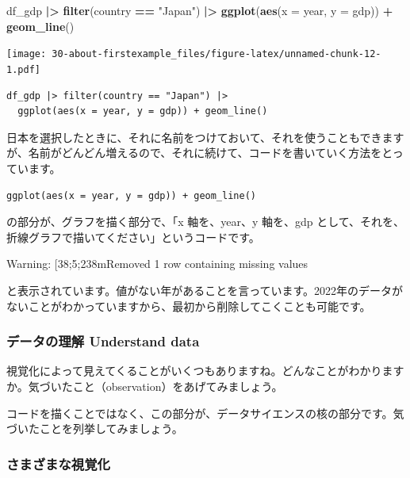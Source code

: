 \documentclass[
  xelatex, ja=standard]{bxjsbook}
\newenvironment{Shaded}{\begin{snugshade}}{\end{snugshade}}
\newcommand{\AttributeTok}[1]{\textcolor[rgb]{0.13,0.29,0.53}{#1}}
\newcommand{\FunctionTok}[1]{\textcolor[rgb]{0.13,0.29,0.53}{\textbf{#1}}}
\newcommand{\NormalTok}[1]{#1}
\newcommand{\SpecialCharTok}[1]{\textcolor[rgb]{0.81,0.36,0.00}{\textbf{#1}}}
\newcommand{\StringTok}[1]{\textcolor[rgb]{0.31,0.60,0.02}{#1}}
\theoremstyle{definition}
\theoremstyle{definition}
\theoremstyle{definition}
\theoremstyle{definition}
\theoremstyle{remark}
\begin{document}
\begin{Shaded}
\begin{Highlighting}[]
\NormalTok{df\_gdp }\SpecialCharTok{|\textgreater{}} \FunctionTok{filter}\NormalTok{(country }\SpecialCharTok{==} \StringTok{"Japan"}\NormalTok{) }\SpecialCharTok{|\textgreater{}}
  \FunctionTok{ggplot}\NormalTok{(}\FunctionTok{aes}\NormalTok{(}\AttributeTok{x =}\NormalTok{ year, }\AttributeTok{y =}\NormalTok{ gdp)) }\SpecialCharTok{+} \FunctionTok{geom\_line}\NormalTok{()}
\end{Highlighting}
\end{Shaded}

\texttt{[image: 30-about-firstexample\_files/figure-latex/unnamed-chunk-12-1.pdf]}

\begin{verbatim}
df_gdp |> filter(country == "Japan") |>
  ggplot(aes(x = year, y = gdp)) + geom_line()
\end{verbatim}

日本を選択したときに、それに名前をつけておいて、それを使うこともできますが、名前がどんどん増えるので、それに続けて、コードを書いていく方法をとっています。

\texttt{ggplot(aes(x\ =\ year,\ y\ =\ gdp))\ +\ geom\_line()}

の部分が、グラフを描く部分で、「x 軸を、year、y 軸を、gdp として、それを、折線グラフで描いてください」というコードです。

Warning: {[}38;5;238mRemoved 1 row containing missing values

と表示されています。値がない年があることを言っています。2022年のデータがないことがわかっていますから、最初から削除してこくことも可能です。

\hypertarget{ux30c7ux30fcux30bfux306eux7406ux89e3-understand-data-1}{%
\subsubsection{データの理解 Understand data}\label{ux30c7ux30fcux30bfux306eux7406ux89e3-understand-data-1}}

視覚化によって見えてくることがいくつもありますね。どんなことがわかりますか。気づいたこと（observation）をあげてみましょう。

コードを描くことではなく、この部分が、データサイエンスの核の部分です。気づいたことを列挙してみましょう。

\hypertarget{ux3055ux307eux3056ux307eux306aux8996ux899aux5316-1}{%
\subsubsection{さまざまな視覚化}\label{ux3055ux307eux3056ux307eux306aux8996ux899aux5316-1}}
\end{document}
